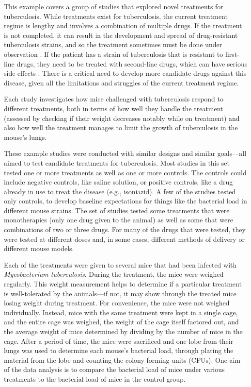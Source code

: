 \documentclass[]{tufte-book}
\begin{document}
This example covers a group of studies that explored novel
treatments for tuberculosis. While treatments exist for tuberculosis, the
current treatment regime is lengthy and involves a combination of multiple
drugs. If the treatment is not completed, it can result in the development and
spread of drug-resistant tuberculosis strains, and so the treatment sometimes
must be done under observation \citep{barry2009new}. If the patient has a
strain of tuberculosis that is resistant to first-line drugs, they
need to be treated with second-line drugs, which can have serious side effects
\citep{barry2009new}. There is a critical need to develop more candidate drugs
against this disease, given all the limitations and struggles of the current
treatment regime.

Each study investigates how mice challenged with tuberculosis respond
to different treatments, both in terms of how well they handle the treatment
(assessed by checking if their weight decreases notably while on treatment) and
also how well the treatment manages to limit the growth of tuberculosis in the
mouse's lungs.

These example studies were conducted with similar designs and similar
goals---all aimed to test candidate treatments for tuberculosis. Most studies in
this set tested one or more treatments as well as one or more controls. The
controls could include negative controls, like saline solution, or positive
controls, like a drug already in use to treat the disease (e.g., isoniazid). A
few of the studies tested only controls, to develop baseline expectations for
things like the bacterial load in different mouse strains. The set of studies
tested some treatments that were monotherapies (only one drug given to the
animal) as well as some that were combinations of two or three drugs.
For many of the drugs that were tested, they were tested at different doses and,
in some cases, different methods of delivery or different mouse models.

Each of the treatments were given to several mice that had been infected with
\emph{Mycobacterium tuberculosis}. During the treatment, the mice were weighed
regularly. This weight measurement helps to determine if a particular treatment
is well-tolerated by the animals---if not, it may show through the treated mice
losing weight during treatment. For convenience, the mice were not weighed
individually. Instead, mice with the same treatment were kept in a single cage,
and the entire cage was weighed, the weight of the cage itself factored out, and
the average weight of mice determined by dividing by the number of mice in the
cage. After a period of time, the mice were sacrificed and one lobe from their
lungs was used to determine each mouse's bacterial load, through plating the
material from the lobe and counting the colony forming units (CFUs). One aim of
the data analysis is to compare the bacterial load of mice under various
treatments to the bacterial load of mice in the control group.
\end{document}
